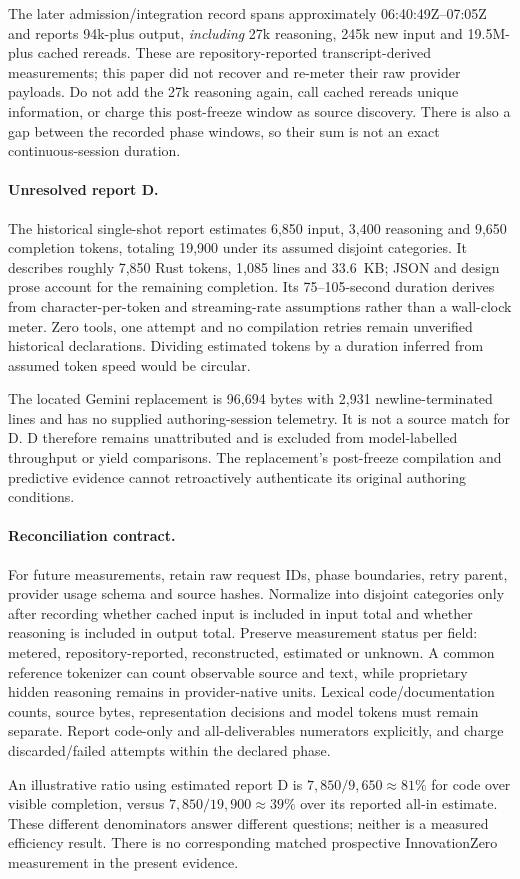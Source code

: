 The later admission/integration record spans approximately
06:40:49Z--07:05Z and reports 94k-plus output, \emph{including} 27k reasoning,
245k new input and 19.5M-plus cached rereads. These are repository-reported
transcript-derived measurements; this paper did not recover and re-meter their
raw provider payloads. Do not add the 27k reasoning again, call cached rereads
unique information, or charge this post-freeze window as source discovery.
There is also a gap between the recorded phase windows, so their sum is not an
exact continuous-session duration.

\paragraph{Unresolved report D.}
The historical single-shot report estimates 6,850 input, 3,400 reasoning and
9,650 completion tokens, totaling 19,900 under its assumed disjoint categories.
It describes roughly 7,850 Rust tokens, 1,085 lines and 33.6~KB; JSON and design
prose account for the remaining completion. Its 75--105-second duration derives
from character-per-token and streaming-rate assumptions rather than a wall-clock
meter. Zero tools, one attempt and no compilation retries remain unverified
historical declarations. Dividing estimated tokens by a duration inferred from
assumed token speed would be circular.

The located Gemini replacement is 96,694 bytes with 2,931 newline-terminated
lines and has no supplied authoring-session telemetry. It is not a source match
for D. D therefore remains unattributed and is excluded from model-labelled
throughput or yield comparisons. The replacement's post-freeze compilation and
predictive evidence cannot retroactively authenticate its original authoring
conditions.

\paragraph{Reconciliation contract.}
For future measurements, retain raw request IDs, phase boundaries, retry parent,
provider usage schema and source hashes. Normalize into disjoint categories only
after recording whether cached input is included in input total and whether
reasoning is included in output total. Preserve measurement status per field:
metered, repository-reported, reconstructed, estimated or unknown. A common
reference tokenizer can count observable source and text, while proprietary
hidden reasoning remains in provider-native units. Lexical code/documentation
counts, source bytes, representation decisions and model tokens must remain
separate. Report code-only and all-deliverables numerators explicitly, and charge
discarded/failed attempts within the declared phase.

An illustrative ratio using estimated report D is $7{,}850/9{,}650\approx81\%$
for code over visible completion, versus $7{,}850/19{,}900\approx39\%$ over its
reported all-in estimate. These different denominators answer different
questions; neither is a measured efficiency result. There is no corresponding
matched prospective InnovationZero measurement in the present evidence.
